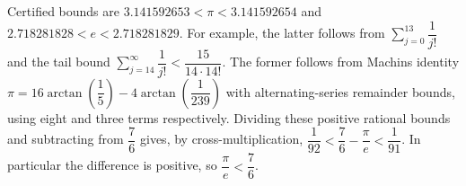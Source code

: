 Certified bounds are $3.141592653<\pi<3.141592654$ and $2.718281828<e<2.718281829$. For example, the latter follows from $\sum_{j=0}^{13}\dfrac{1}{j!}$ and the tail bound $\sum_{j=14}^{\infty}\dfrac{1}{j!}<\dfrac{15}{14\cdot14!}$. The former follows from Machin\textquotesingle s identity $\pi = 16 \arctan (\dfrac{1}{5}) - 4 \arctan (\dfrac{1}{239})$ with alternating-series remainder bounds, using eight and three terms respectively. Dividing these positive rational bounds and subtracting from $\dfrac{7}{6}$ gives, by cross-multiplication, $\dfrac{1}{92}<\dfrac{7}{6}-\dfrac{\pi}{e}<\dfrac{1}{91}$. In particular the difference is positive, so $\dfrac{\pi}{e}<\dfrac{7}{6}$.

